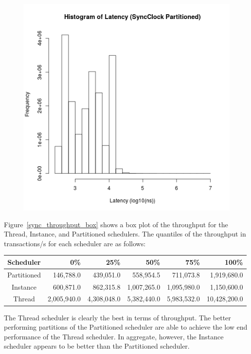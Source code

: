 \begin{figure}
\center
\includegraphics[height=.4\textheight]{sync_partitioned_latency_hist.png}
\caption{\label{sync_partitioned_latency}}
\end{figure}

Figure~\ref{sync_throughput_box} shows a box plot of the throughput for the Thread, Instance, and Partitioned schedulers.
The quantiles of the throughput in transactions/s for each scheduler are as follows:
\begin{center}
\begin{tabular}{crrrrr}
Scheduler   &       0\%   &    25\%     &    50\%     &    75\%     &   100\% \\
\hline
Partitioned &   146,788.0 &   439,051.0 &   558,954.5 &   711,073.8 &  1,919,680.0 \\
Instance    &   600,871.0 &   862,315.8 & 1,007,265.0 & 1,095,980.0 &  1,150,600.0 \\
Thread      & 2,005,940.0 & 4,308,048.0 & 5,382,440.0 & 5,983,532.0 & 10,428,200.0 \\
\end{tabular}
\end{center}
The Thread scheduler is clearly the best in terms of throughput.
The better performing partitions of the Partitioned scheduler are able to achieve the low end performance of the Thread scheduler.
In aggregate, however, the Instance scheduler appears to be better than the Partitioned scheduler.

